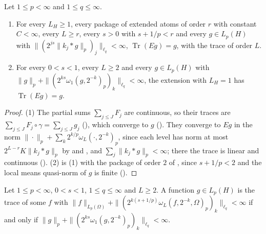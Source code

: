\begin{theorem}
\label{thm:trace-extension}
\leanok
{}
Let $1 \leq p < \infty$ and $1 \leq q \leq \infty$.
\begin{enumerate}
  \item For every $L_H \geq 1$, every package of extended atoms of order $r$ with constant
    $C < \infty$, every $L \geq r$,
    every $s > 0$ with $s + 1/p < r$ and every $g \in L_p(H)$ with
    $\|(2^{js} \|k_j * g\|_p)_j\|_{\ell_q} < \infty$, $\operatorname{Tr}(E g) = g$, with the trace
    of order $L$.
  \item For every $0 < s < 1$, every $L \geq 2$ and every $g \in L_p(H)$ with
    $\|g\|_p + \|(2^{ks} \omega_1(g, 2^{-k})_p)_k\|_{\ell_q} < \infty$, the extension with
    $L_H = 1$ has $\operatorname{Tr}(E g) = g$.
\end{enumerate}
\end{theorem}

\begin{proof}
\leanok
(1) The partial sums $\sum_{j \leq J} F_j$ are continuous, so their traces are
$\sum_{j \leq J} F_j \circ \gamma = \sum_{j \leq J} g_j$ (), which converge
to $g$ (). They converge to $E g$ in the norm
$\|\cdot\|_p + \sum_k 2^{k/p} \omega_L(\cdot, 2^{-k})_p$, since each level has norm at most
$2^{L - r} K \|k_j * g\|_p$ by  and , and
$\sum_j \|k_j * g\|_p < \infty$; there the trace is linear and continuous ().
(2) is (1) with the package of order $2$ of , since $s + 1/p < 2$ and
the local means quasi-norm of $g$ is finite ().
\end{proof}

\begin{theorem}
\label{thm:graph-trace-space}
\leanok
{}
Let $1 \leq p < \infty$, $0 < s < 1$, $1 \leq q \leq \infty$ and $L \geq 2$. A function
$g \in L_p(H)$ is the trace of some $f$ with
$\|f\|_{L_p(\Omega)} + \|(2^{k(s + 1/p)} \omega_L(f, 2^{-k}, \Omega)_p)_k\|_{\ell_q} < \infty$ if and
only if $\|g\|_p + \|(2^{ks} \omega_1(g, 2^{-k})_p)_k\|_{\ell_q} < \infty$.
\end{theorem}

